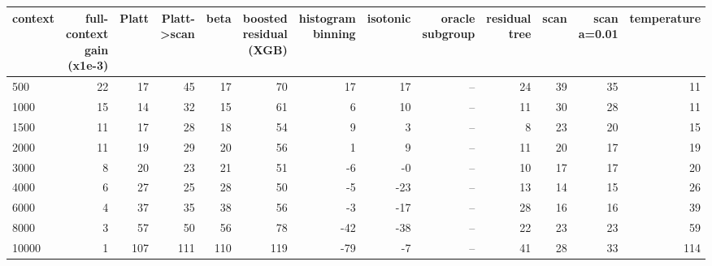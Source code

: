 \begin{tabular}{lrrrrrrrrrrrr}
\toprule
context & full-context gain (x1e-3) & Platt & Platt->scan & beta & boosted residual (XGB) & histogram binning & isotonic & oracle subgroup & residual tree & scan & scan a=0.01 & temperature \\
\midrule
500 & 22 & 17 & 45 & 17 & 70 & 17 & 17 & -- & 24 & 39 & 35 & 11 \\
1000 & 15 & 14 & 32 & 15 & 61 & 6 & 10 & -- & 11 & 30 & 28 & 11 \\
1500 & 11 & 17 & 28 & 18 & 54 & 9 & 3 & -- & 8 & 23 & 20 & 15 \\
2000 & 11 & 19 & 29 & 20 & 56 & 1 & 9 & -- & 11 & 20 & 17 & 19 \\
3000 & 8 & 20 & 23 & 21 & 51 & -6 & -0 & -- & 10 & 17 & 17 & 20 \\
4000 & 6 & 27 & 25 & 28 & 50 & -5 & -23 & -- & 13 & 14 & 15 & 26 \\
6000 & 4 & 37 & 35 & 38 & 56 & -3 & -17 & -- & 28 & 16 & 16 & 39 \\
8000 & 3 & 57 & 50 & 56 & 78 & -42 & -38 & -- & 22 & 23 & 23 & 59 \\
10000 & 1 & 107 & 111 & 110 & 119 & -79 & -7 & -- & 41 & 28 & 33 & 114 \\
\bottomrule
\end{tabular}
